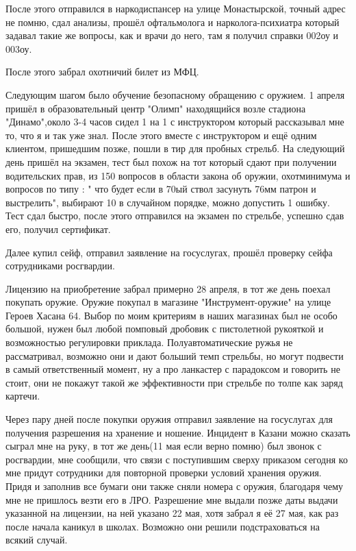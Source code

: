 \begin{itemize}
После этого отправился в наркодиспансер на улице Монастырской, точный адрес не
помню, сдал анализы, прошёл офтальмолога и нарколога-психиатра который задавал
такие же вопросы, как и врачи до него, там я получил справки 002оу и 003оу.

\begin{itemize} %

После этого забрал охотничий билет из МФЦ.

Следующим шагом было обучение безопасному обращению с оружием. 1 апреля пришёл в
образовательный центр "Олимп" находящийся возле стадиона "Динамо",около 3-4
часов сидел 1 на 1 с инструктором который рассказывал мне то, что я и так уже
знал. После этого вместе с инструктором и ещё одним клиентом, пришедшим
позже, пошли в тир для пробных стрельб. На следующий день пришёл на экзамен, тест
был похож на тот который сдают при получении водительских прав, из 150 вопросов
в области закона об оружии, охотминимума и вопросов по типу : " что будет если в
70ый ствол засунуть 76мм патрон и выстрелить", выбирают 10 в случайном
порядке, можно допустить 1 ошибку. Тест сдал быстро, после этого отправился на
экзамен по стрельбе, успешно сдав его, получил сертификат.

Далее купил сейф, отправил заявление на госуслугах, прошёл проверку сейфа
сотрудниками росгвардии.

Лицензию на приобретение забрал примерно 28 апреля, в тот же день поехал
покупать оружие. Оружие покупал в магазине "Инструмент-оружие" на улице Героев
Хасана 64. Выбор по моим критериям в наших магазинах был не особо большой, нужен
был любой помповый дробовик с пистолетной рукояткой и возможностью регулировки
приклада. Полуавтоматические ружья не рассматривал, возможно они и дают больший
темп стрельбы, но могут подвести в самый ответственный момент, ну а про ланкастер
с парадоксом и говорить не стоит, они не покажут такой же эффективности при
стрельбе по толпе как заряд картечи.

Через пару дней после покупки оружия отправил заявление на госуслугах для
получения разрешения на хранение и ношение. Инцидент в Казани можно сказать
сыграл мне на руку, в тот же день(11 мая если верно помню) был звонок с
росгвардии, мне сообщили, что связи с поступившим сверху приказом сегодня ко мне
придут сотрудники для повторной проверки условий хранения оружия. Придя и
заполнив все бумаги они также сняли номера с оружия, благодаря чему мне не
пришлось везти его в ЛРО. Разрешение мне выдали позже даты выдачи указанной на
лицензии, на ней указано 22 мая, хотя забрал я её 27 мая, как раз после начала
каникул в школах. Возможно они решили подстраховаться на всякий случай.


\end{itemize}
\end{itemize}
